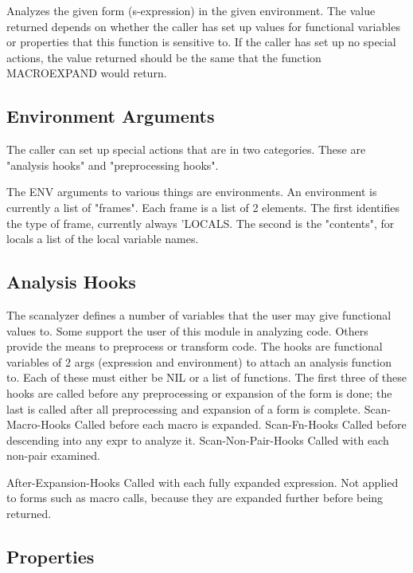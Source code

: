 {    Analyzes   the   given  form  (s-expression)  in  the  given
    environment.  The value  returned  depends  on  whether  the
    caller  has  set  up  values  for  functional  variables  or
    properties that this function  is  sensitive  to.    If  the
    caller  has  set  up  no special actions, the value returned
    should be the  same  that  the  function  MACROEXPAND  would
    return.
}
\subsection{Environment Arguments}

  The  caller  can  set  up  special  actions  that  are  in two
categories.   These  are  "analysis  hooks"  and  "preprocessing
hooks".

  The  ENV  arguments  to  various  things are environments.  An
environment is currently a list of "frames".  Each  frame  is  a
list  of  2  elements.   The first identifies the type of frame,
currently always 'LOCALS.  The second  is  the  "contents",  for
locals a list of the local variable names.

\subsection{Analysis Hooks}

  The scanalyzer defines a number of variables that the user may
give functional values to. Some support the user of this module
in  analyzing  code. Others provide the means to preprocess or
transform code. The hooks are functional variables  of 2  args
(expression and environment) to attach an analysis function to.
Each of these must either be NIL or a list of functions. The
first three of these hooks are called before any preprocessing
or expansion of the form is done; the last is called after all
preprocessing and expansion of a form is complete. Scan-Macro-Hooks
Called before each macro is expanded. Scan-Fn-Hooks Called  before
descending into any expr to analyze it. Scan-Non-Pair-Hooks Called
with each non-pair examined.

After-Expansion-Hooks Called with each fully expanded
    expression. Not applied to forms such as macro
    calls, because they are expanded further before
    being returned.


\subsection{Properties}

